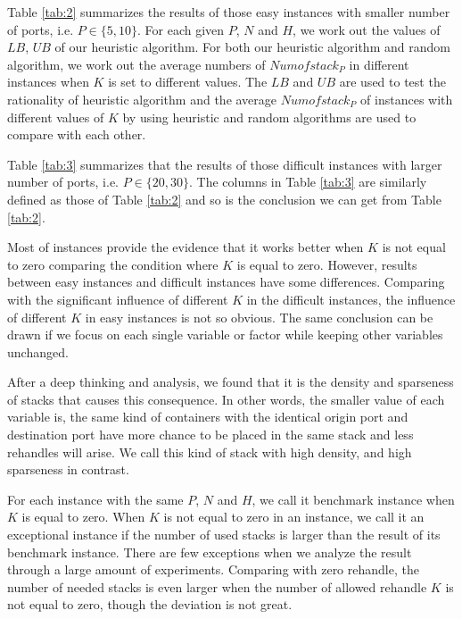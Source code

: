\documentclass[review,3p,times,authoryear,12pt]{elsarticle}
\begin{document}
Table \ref{tab:2} summarizes the results of those easy instances with smaller number of ports, i.e. $P \in \{5, 10\}$.
For each given $P$, $N$ and $H$, we work out the values of $LB$, $UB$ of our heuristic algorithm.
For both our heuristic algorithm and random algorithm, we work out the average numbers of $Numofstack_P$ in different instances when $K$ is set to different values.
The $LB$ and $UB$ are used to test the rationality of heuristic algorithm and the average $Numofstack_P$ of instances with different values of $K$ by using heuristic and random algorithms are used to compare with each other.

Table \ref{tab:3} summarizes that the results of those difficult instances with larger number of ports, i.e. $P \in \{20, 30\}$.
The columns in Table \ref{tab:3} are similarly defined as those of Table \ref{tab:2} and so is the conclusion we can get from Table \ref{tab:2}.

Most of instances provide the evidence that it works better when $K$ is not equal to zero comparing the condition where $K$ is equal to zero.
However, results between easy instances and difficult instances have some differences.
Comparing with the significant influence of different $K$ in the difficult instances, the influence of different $K$ in easy instances is not so obvious.
The same conclusion can be drawn if we focus on each single variable or factor while keeping other variables unchanged.

After a deep thinking and analysis, we found that it is the density and sparseness of stacks that causes this consequence.
In other words, the smaller value of each variable is, the same kind of containers with the identical origin port and destination port have more chance to be placed in the same stack and less rehandles will arise.
We call this kind of stack with high density, and high sparseness in contrast.

For each instance with the same $P$, $N$ and $H$, we call it benchmark instance when $K$ is equal to zero.
When $K$ is not equal to zero in an instance, we call it an exceptional instance if the number of used stacks is larger than the result of its benchmark instance.
There are few exceptions when we analyze the result through a large amount of experiments.
Comparing with zero rehandle, the number of needed stacks is even larger when the number of allowed rehandle $K$ is not equal to zero, though the deviation is not great.
\end{document}

